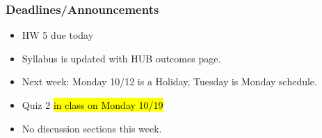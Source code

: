 \begin{frame}
    \frametitle{Deadlines/Announcements}
\begin{itemize}
            \item HW 5 due today
            \item Syllabus is updated with HUB outcomes page. 
            \item Next week: Monday 10/12 is a Holiday, Tuesday is Monday schedule.
            \item Quiz 2 \hl{in class on Monday 10/19} %
            \item No discussion sections this week. %
        \end{itemize}
\end{frame}